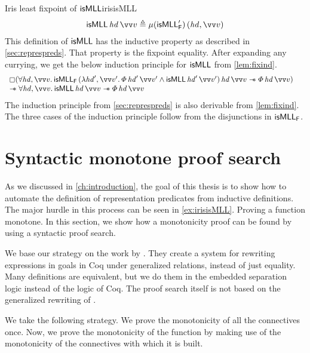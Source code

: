 \documentclass[thesis.tex]{subfiles}
\begin{document}
\begin{example}{Iris least fixpoint of $\textsf{\upshape isMLL}$}{irisisMLL}
    \begin{align*}
        \isMLL\, \hd\, \vect{\val} \eqdef \lfp(\isMLL'_\hopred)\, (\hd, \vect{\val})
    \end{align*}
    This definition of $\textsf{\upshape isMLL}$ has the inductive property as described in \cref{sec:represpreds}. That property is the fixpoint equality. After expanding any currying, we get the below induction principle for $\textsf{\upshape isMLL}$ from \cref{lem:fixind}.
    \begin{align*}
         & \begin{array}{l}
               \always(\All\hd,\vect{\val}.\isMLL_\hopred\,(\Lam\hd',\vect{\val}'. \pred\,\hd'\,\vect{\val}' \land \isMLL\,\hd'\,\vect{\val}')\,\hd\,\vect{\val} \wand \pred\,\hd\,\vect{\val}) \\
               \wand \All\hd,\vect{\val}. \isMLL\,\hd\,\vect{\val} \wand \pred\,\hd\,\vect{\val}
           \end{array}
    \end{align*}
    The induction principle from \cref{sec:represpreds} is also derivable from \cref{lem:fixind}. The three cases of the induction principle follow from the disjunctions in $\textsf{\upshape isMLL}_{\textsf{\upshape F}}$.

\end{example}

\section{Syntactic monotone proof search}
\label{sec:monoproofsearch}%
As we discussed in \cref{ch:introduction}, the goal of this thesis is to show how to automate the definition of representation predicates from inductive definitions. The major hurdle in this process can be seen in \cref{ex:irisisMLL}. Proving a function monotone. In this section, we show how a monotonicity proof can be found by using a syntactic proof search.

We base our strategy on the work by  \cite{sozeauNewLookGeneralized2009}. They create a system for rewriting expressions in goals in Coq under generalized relations, instead of just equality. Many definitions are equivalent, but we do them in the embedded separation logic instead of the logic of Coq. The proof search itself is not based on the generalized rewriting of .

We take the following strategy. We prove the monotonicity of all the connectives once. Now, we prove the monotonicity of the function by making use of the monotonicity of the connectives with which it is built.
\end{document}
